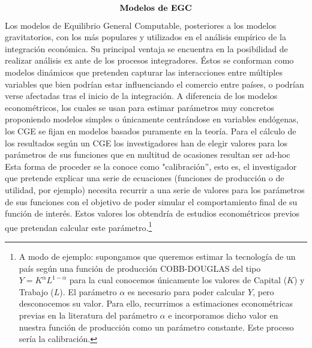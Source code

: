 \documentclass[10pt,a4paper]{article}
\begin{document}
$$\text{\textbf{Modelos de EGC}}$$
Los modelos de Equilibrio General Computable, posteriores a los modelos gravitatorios, con los más populares y utilizados en el análisis empírico de la integración económica. Su principal ventaja se encuentra en la posibilidad de realizar análisis ex ante de los procesos integradores. Éstos se conforman como modelos dinámicos que pretenden capturar las interacciones entre múltiples variables que bien podrían estar influenciando el comercio entre países, o podrían verse afectadas tras el inicio de la integración. A diferencia de los modelos econométricos, los cuales se usan para estimar parámetros muy concretos proponiendo modelos simples o únicamente centrándose en variables endógenas, los CGE se fijan en modelos basados puramente en la teoría. Para el cálculo de los resultados según un CGE los investigadores han de elegir valores para los parámetros de sus funciones que en multitud de ocasiones resultan ser ad-hoc Esta forma de proceder se la conoce como "calibración'', esto es, el investigador que pretende explicar una serie de ecuaciones (funciones de producción o de utilidad, por ejemplo) necesita recurrir a una serie de valores para los parámetros de sus funciones con el objetivo de poder simular el comportamiento final de su función de interés. Estos valores los obtendría de estudios econométricos previos que pretendan calcular este parámetro.\footnote{%
    A modo de ejemplo: supongamos que queremos estimar la tecnología de un país según una función de producción COBB-DOUGLAS del tipo $Y=K^\alpha L^{1-\alpha}$ para la cual conocemos únicamente los valores de Capital ($K$) y Trabajo ($L$). El parámetro $\alpha$ es necesario para poder calcular $Y$, pero desconocemos su valor. Para ello, recurrimos a estimaciones econométricas previas en la literatura del parámetro $\alpha$ e incorporamos dicho valor en nuestra función de producción como un parámetro constante. Este proceso sería la calibración.
}
\end{document}
